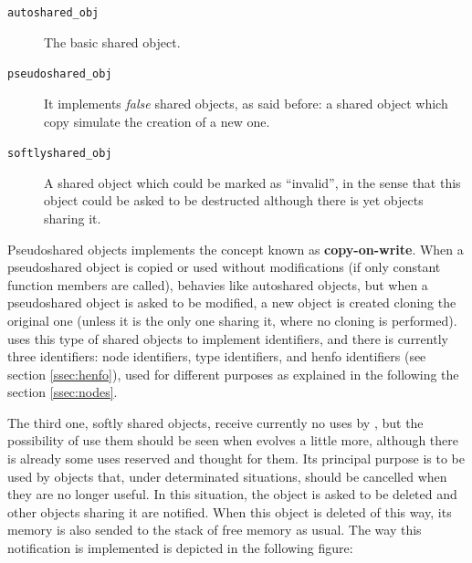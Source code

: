 \documentclass{article}
\begin{document}
\begin{description}
  \item[\texttt{autoshared\_obj}] The basic shared object.
  \item[\texttt{pseudoshared\_obj}] It implements \textit{false} shared objects,
    as said before: a shared object which copy simulate the creation of a new
    one.
  \item[\texttt{softlyshared\_obj}] A shared object which could be marked as
    ``invalid'', in the sense that this object could be asked to be destructed
    although there is yet objects sharing it.
\end{description}

Pseudoshared objects implements the concept known as
\textbf{copy-on-write}. When a pseudoshared object is copied or used without
modifications (if only constant function members are called), behavies like
autoshared objects, but when a pseudoshared object is asked to be modified, a
new object is created cloning the original one (unless it is the only one
sharing it, where no cloning is performed). \fav uses this type of shared
objects to implement identifiers, and there is currently three identifiers: node
identifiers, type identifiers, and henfo identifiers (see section
\ref{ssec:henfo}), used for different purposes as explained in the following
the section \ref{ssec:nodes}.

The third one, softly shared objects, receive currently no uses by \fav, but the
possibility of use them should be seen when \fav evolves a little more, although
there is already some uses reserved and thought for them. Its principal purpose
is to be used by objects that, under determinated situations, should be
cancelled when they are no longer useful. In this situation, the object is asked
to be deleted and other objects sharing it are notified. When this object is
deleted of this way, its memory is also sended to the stack of free memory as
usual. The way this notification is implemented is depicted in the following
figure:
\end{document}
